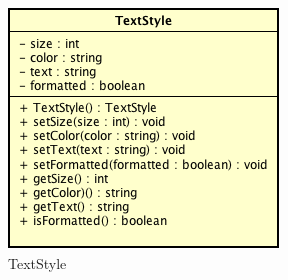 \label{TextStyle}
\begin{figure}[ht]
	\centering
	\includegraphics[scale=0.5]{Sezioni/SottosezioniST/img/TextStyle.png}
	\caption{TextStyle}
\end{figure}

